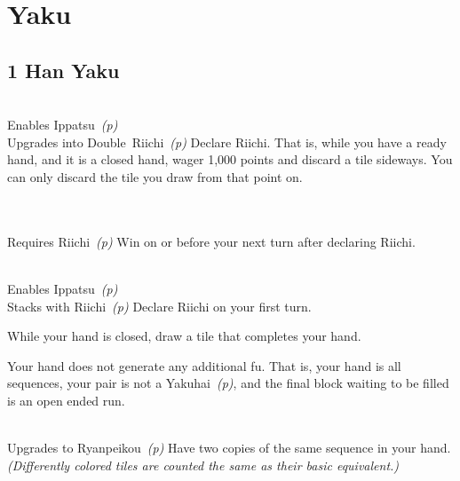 \section{Yaku}\label{core:sec:yaku}

\subsection{1 Han Yaku}\label{core:ssec:1-han-yaku}

	{\closedhand \\ 
	\upgradesto Enables Ippatsu~\textit{(p\pageref{core:yaku:Ippatsu})} \\ 
	\upgradesto Upgrades into Double~Riichi~\textit{(p\pageref{core:yaku:Double Riichi})}}
	{Declare Riichi. That is, while you have a ready hand, and it is a closed hand, wager 1,000 points and discard a tile sideways. You can only discard the tile you draw from that point on.}

	{\closedhand \\ 
	\brokenhand \\
	\upgradesfrom Requires Riichi~\textit{(p\pageref{core:yaku:Riichi})}}
	{Win on or before your next turn after declaring Riichi.}

	{\closedhand \\ 
	\upgradesto Enables Ippatsu~\textit{(p\pageref{core:yaku:Ippatsu})} \\ 
	\upgradesfrom Stacks with Riichi~\textit{(p\pageref{core:yaku:Riichi})}}
	{Declare Riichi on your first turn.}

	{\closedhand}
	{While your hand is closed, draw a tile that completes your hand.}

	{\closedhand}
	{Your hand does not generate any additional fu. That is, your hand is all sequences, your pair is not a Yakuhai~\textit{(p\pageref{core:yaku:Yakuhai})}, and the final block waiting to be filled is an open ended run.}

	{\closedhand \\
	\upgradesto Upgrades to Ryanpeikou~\textit{(p\pageref{core:yaku:Ryanpeikou})}}
	{Have two copies of the same sequence in your hand. \textit{(Differently colored tiles are counted the same as their basic equivalent.)}}

